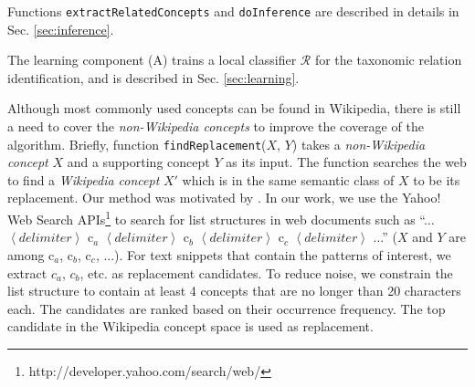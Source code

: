 
Functions \texttt{extractRelatedConcepts} and \texttt{doInference} are
described in details in Sec. \ref{sec:inference}.

The learning component (A) trains a local classifier $\mathcal{R}$ for
the taxonomic relation identification, and is described in Sec. \ref{sec:learning}.

Although most commonly used concepts can be found in Wikipedia, there
is still a need to cover the {\em non-Wikipedia concepts} to improve
the coverage of the algorithm. Briefly, function
\texttt{findReplacement}($X$, $Y$) takes a {\em non-Wikipedia concept}
$X$ and a supporting concept $Y$ as its input. The function searches
the web to find a {\em Wikipedia concept} $X'$ which is in the same
semantic class of $X$ to be its replacement. Our method was motivated
by \cite{1321585}.  In our work, we use the Yahoo! Web Search
APIs\footnote{http://developer.yahoo.com/search/web/} to search for
list structures in web documents such as ``... $\left < delimiter
\right >$ c$_a$ $\left < delimiter \right >$ c$_b$ $\left < delimiter
\right >$ c$_c$ $\left < delimiter \right >$ ...'' ($X$ and $Y$ are
among c$_a$, c$_b$, c$_c$, ...). For text snippets that contain the
patterns of interest, we extract $c_a$, $c_b$, etc. as replacement
candidates. To reduce noise, we constrain the list structure to
contain at least 4 concepts that are no longer than 20 characters
each. The candidates are ranked based on their occurrence
frequency. The top candidate in the Wikipedia concept space is used as
replacement.

